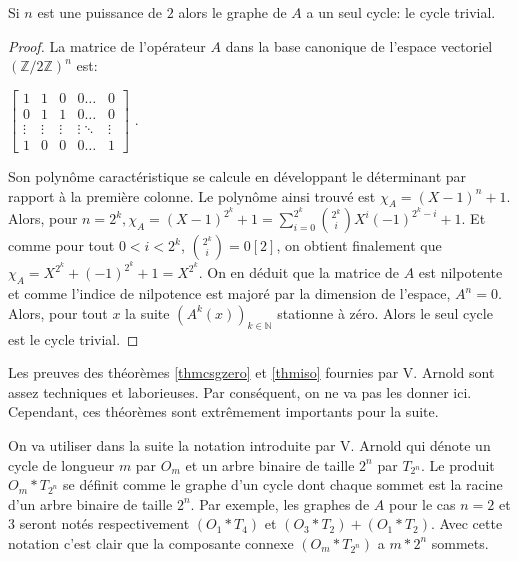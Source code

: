 \begin{thm}
Si $n$ est une puissance de $2$ alors le graphe de $A$ a un seul cycle: le cycle trivial. 
\end{thm}
\begin{proof}
La matrice de l'op\'erateur $A$  dans la base canonique de l'espace vectoriel $(\mathbb{Z}/2\mathbb{Z})^n$ est:

$\begin{bmatrix}
    1 & 1 & 0 & 0\dots & 0 \\
    0 & 1 & 1 & 0\dots & 0 \\
    \vdots & \vdots & \vdots & \vdots \ddots & \vdots \\
    1 & 0 & 0 & 0\dots & 1
\end{bmatrix}$ .\newline

Son polyn\^ome caract\'eristique se calcule en d\'eveloppant le d\'eterminant par rapport \`a la premi\`ere colonne. Le polynôme ainsi trouv\'e est $\chi_A = (X-1)^n + 1$.
Alors, pour $n=2^k, \chi_A=(X-1)^{2^k} + 1 = \sum_{i=0}^{2^k} {{2^k}\choose{i}}X^i(-1)^{2^k-i} + 1$. Et comme pour tout $0<i<2^k$, ${{2^k}\choose{i}} = 0 [2]$, on obtient finalement que
$\chi_A=X^{2^k} + (-1)^{2^k} + 1 = X^{2^k}$. On en d\'eduit que la matrice de $A$ est nilpotente et comme l'indice de nilpotence est major\'e par la dimension de l'espace, $A^n=0$. Alors, pour tout $x$ la suite $(A^k(x))_{k \in \mathbb{N}}$  stationne \`a z\'ero. Alors le seul cycle est le cycle trivial.
\end{proof}

Les preuves des th\'eor\`emes \ref{thmcsgzero} et \ref{thmiso} fournies par V. Arnold \cite{VA} sont assez techniques et laborieuses. Par cons\'equent, on ne va pas les donner ici. Cependant, ces th\'eor\`emes sont extr\^emement importants pour la suite.

\begin{definition}
On va utiliser dans la suite la notation introduite par V. Arnold \cite{VA} qui d\'enote un cycle de longueur $m$ par $O_m$ et un arbre binaire de taille $2^n$ par $T_{2^n}$. Le produit $O_m*T_{2^n}$ se d\'efinit comme le graphe d’un cycle dont chaque sommet est la racine d’un arbre binaire de taille $2^n$. Par exemple, les graphes de $A$ pour le cas $n=2$ et $3$ seront not\'es respectivement $(O_1*T_4)$ et $(O_3*T_2) + (O_1*T_2)$. Avec cette notation c’est clair que la composante connexe $(O_m*T_{2^n})$ a $m*2^n$ sommets.
\end{definition}

